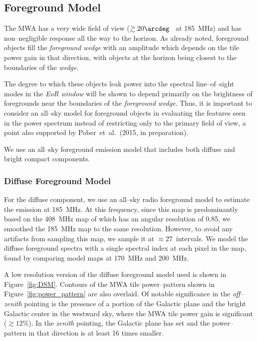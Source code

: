 \documentclass[preprint2,iop,numberedappendix]{emulateapj}
\begin{document}
\subsection{Foreground Model}\label{sec:foreground}

The MWA has a very wide field of view ($\gtrsim 20\arcdeg$~ at 185~MHz) and has non--negligible response all the way to the horizon. As already noted, foreground objects fill the {\it foreground wedge} with an amplitude which depends on the tile power gain in that direction, with objects at the horizon being closest to the boundaries of the {\it wedge}. 

The degree to which these objects leak power into the spectral line--of--sight modes in the {\it EoR window} will be shown to depend primarily on the brightness of foregrounds near the boundaries of the {\it foreground wedge}. Thus, it is important to consider an all--sky model for foreground objects in evaluating the features seen in the power spectrum instead of restricting only to the primary field of view, a point also supported by Pober~et~al.~(2015, in preparation). 

We use an all--sky foreground emission model that includes both diffuse and bright compact components.  

\subsubsection{Diffuse Foreground Model}\label{sec:DSM}

For the diffuse component, we use an all--sky radio foreground model \citep{deo08} to estimate the emission at 185~MHz. At this frequency, since this map is predominantly based on the 408~MHz map of \citet{has82} which has an angular resolution of 0.85\arcdeg, we smoothed the 185~MHz map to the same resolution. However, to avoid any artifacts from sampling this map, we sample it at $\approx 27$\arcmin~intervals. We model the diffuse foreground spectra with a single spectral index at each pixel in the map, found by comparing model maps at 170~MHz and 200~MHz.

A low resolution version of the diffuse foreground model used is shown in Figure~\ref{fig:DSM}. Contours of the MWA tile power--pattern shown in Figure~\ref{fig:power_pattern} are also overlaid. Of notable significance in the {\it off--zenith} pointing is the presence of a portion of the Galactic plane and the bright Galactic center in the westward sky, where the MWA tile power gain is significant ($\gtrsim 12$\%). In the {\it zenith} pointing, the Galactic plane has set and the power--pattern in that direction is at least 16 times smaller. 
\end{document}
